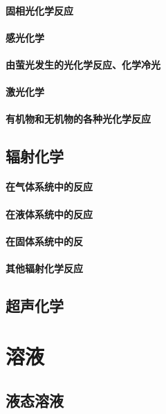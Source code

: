 \documentclass[UTF8]{../03-Chemistry}
\begin{document}
    \subsubsection{固相光化学反应}
    \subsubsection{感光化学}
    \subsubsection{由萤光发生的光化学反应、化学冷光}
    \subsubsection{激光化学}
    \subsubsection{有机物和无机物的各种光化学反应}
\section{辐射化学}
    \subsubsection{在气体系统中的反应}
    \subsubsection{在液体系统中的反应}
    \subsubsection{在固体系统中的反}
    \subsubsection{其他辐射化学反应}
\section{超声化学}






\chapter{溶液}
\section{液态溶液}
\end{document}
